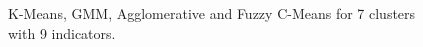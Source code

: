 \documentclass[conference]{IEEEtran}
\begin{document}
\begin{figure}

    \caption{K-Means, GMM, Agglomerative and Fuzzy C-Means for 7 clusters with 9 indicators.}
        
\end{figure}




\end{document}
